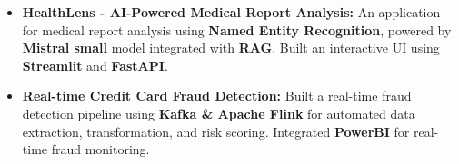 \documentclass[letterpaper,6pt]{article}
\begin{document}
\begin{itemize}

     \item \textbf{\footnotesize{HealthLens - AI-Powered Medical Report Analysis:}} An application for medical report analysis using \textbf{Named Entity Recognition}, powered by \textbf{Mistral small} model integrated with \textbf{RAG}. Built an interactive UI using \textbf{Streamlit} and \textbf{FastAPI}.

    \vspace{-1pt}
     
     \item \textbf{\footnotesize{Real-time Credit Card Fraud Detection:}} Built a real-time fraud detection pipeline using \textbf{Kafka \& Apache Flink} for automated data extraction, transformation, and risk scoring. Integrated \textbf{PowerBI} for real-time fraud monitoring.

    \vspace{-1pt}


  

  




   
 
\end{itemize}
\vspace{-14pt}
\end{document}
